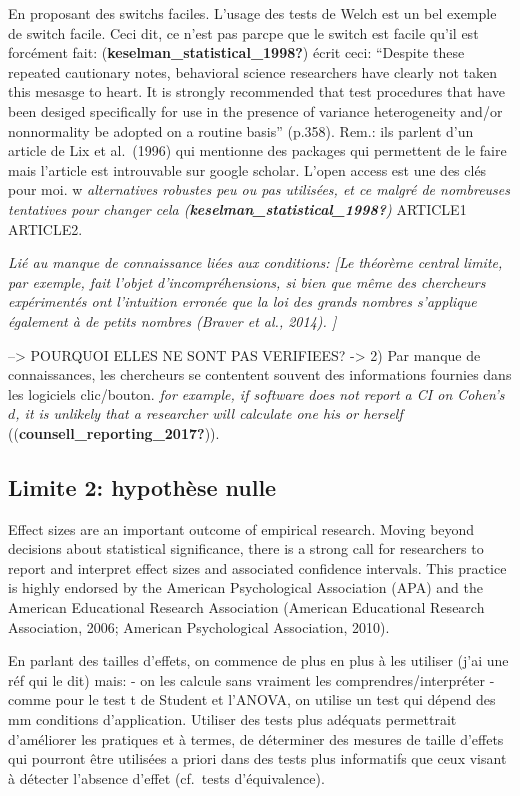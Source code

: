 \documentclass[
  english,
  man]{apa6}
\begin{document}
En proposant des switchs faciles. L'usage des tests de Welch est un bel exemple de switch facile. Ceci dit, ce n'est pas parcpe que le switch est facile qu'il est forcément fait: (\textbf{keselman\_statistical\_1998?}) écrit ceci: ``Despite these repeated cautionary notes, behavioral science researchers have clearly not taken this mesasge to heart. It is strongly recommended that test procedures that have been desiged specifically for use in the presence of variance heterogeneity and/or nonnormality be adopted on a routine basis'' (p.358).
Rem.: ils parlent d'un article de Lix et al.~(1996) qui mentionne des packages qui permettent de le faire mais l'article est introuvable sur google scholar. L'open access est une des clés pour moi. w
\emph{alternatives robustes peu ou pas utilisées, et ce malgré de nombreuses tentatives pour changer cela (\textbf{keselman\_statistical\_1998?})}
ARTICLE1
ARTICLE2.

\emph{Lié au manque de connaissance liées aux conditions: {[}Le théorème central limite, par exemple, fait l'objet d'incompréhensions, si bien que même des chercheurs expérimentés ont l'intuition erronée que la loi des grands nombres s'applique également à de petits nombres (Braver et al., 2014). {]}}

--\textgreater{} POURQUOI ELLES NE SONT PAS VERIFIEES? -\textgreater{}
2) Par manque de connaissances, les chercheurs se contentent souvent des informations fournies dans les logiciels clic/bouton. \emph{for example, if software does not report a CI on Cohen's \(d\), it is unlikely that a researcher will calculate one his or herself} ((\textbf{counsell\_reporting\_2017?})).

\hypertarget{limite-2-hypothuxe8se-nulle}{%
\subsection{Limite 2: hypothèse nulle}\label{limite-2-hypothuxe8se-nulle}}

Effect sizes are an important outcome of empirical research. Moving beyond decisions about statistical significance, there is a strong call for researchers to report and interpret effect sizes and associated confidence intervals. This practice is highly endorsed by the American Psychological Association (APA) and the American Educational Research Association (American Educational Research Association, 2006; American Psychological Association, 2010).

En parlant des tailles d'effets, on commence de plus en plus à les utiliser (j'ai une réf qui le dit) mais:
- on les calcule sans vraiment les comprendres/interpréter
- comme pour le test t de Student et l'ANOVA, on utilise un test qui dépend des mm conditions d'application.
Utiliser des tests plus adéquats permettrait d'améliorer les pratiques et à termes, de déterminer des mesures de taille d'effets qui pourront être utilisées a priori dans des tests plus informatifs que ceux visant à détecter l'absence d'effet (cf.~tests d'équivalence).
\end{document}
